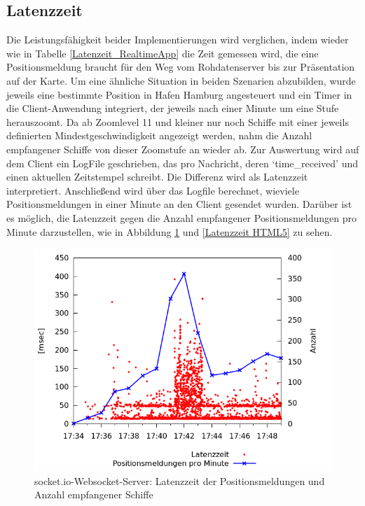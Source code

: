 \subsection{Latenzzeit}
Die Leistungsfähigkeit beider Implementierungen wird verglichen, indem wieder wie in Tabelle \ref{Latenzeit_RealtimeApp} die Zeit gemessen wird, die eine Positionsmeldung braucht für den Weg vom Rohdatenserver bis zur Präsentation auf der Karte. Um eine ähnliche Situation in beiden Szenarien abzubilden, wurde jeweils eine bestimmte Position in Hafen Hamburg angesteuert und ein Timer in die Client-Anwendung integriert, der jeweils nach einer Minute um eine Stufe herauszoomt. Da ab Zoomlevel 11 und kleiner nur noch Schiffe mit einer jeweils definierten Mindestgeschwindigkeit angezeigt werden, nahm die Anzahl empfangener Schiffe von dieser Zoomstufe an wieder ab. Zur Auswertung wird auf dem Client ein LogFile geschrieben, das pro Nachricht, deren ‘time\_received’ und einen aktuellen Zeitstempel schreibt.  Die Differenz wird als Latenzzeit interpretiert. Anschließend wird über das Logfile berechnet, wieviele Positionsmeldungen in einer Minute an den Client gesendet wurden. Darüber ist es möglich, die Latenzzeit gegen die Anzahl empfangener Positionsmeldungen pro Minute darzustellen, wie in Abbildung \ref{Latenzzeit socket.io} und \ref{Latenzzeit HTML5} zu sehen.
\begin {figure}[H]
\begin{center}
  \includegraphics[width=4.5in]{images/latency_timeReceived_socket_io.png}
\end{center}
\caption{socket.io-Websocket-Server: Latenzzeit der Positionsmeldungen und Anzahl empfangener Schiffe}
\label {Latenzzeit socket.io}
\end {figure}


